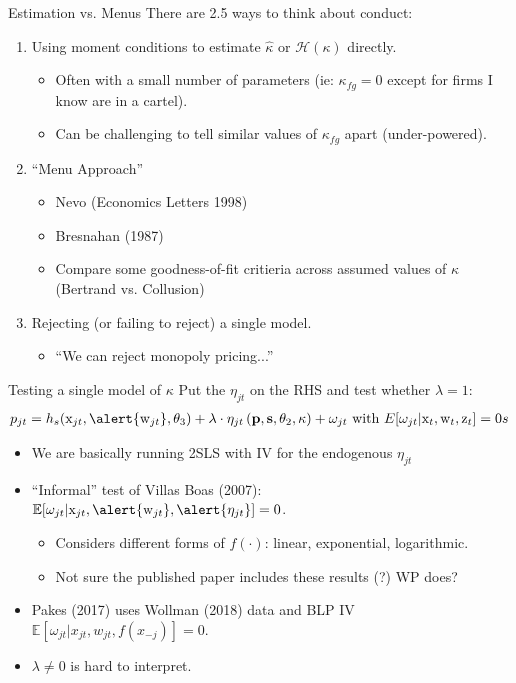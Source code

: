\begin{frame}{Estimation vs. Menus}
There are 2.5 ways to think about conduct:
\begin{enumerate}
\item Using moment conditions to estimate $\widehat{\kappa}$ or $\mathcal{H}(\kappa)$ directly.
\begin{itemize}
\item Often with a small number of parameters (ie: $\kappa_{fg}=0$ except for firms I know are in a cartel).
\item Can be challenging to tell similar values of $\kappa_{fg}$ apart (under-powered).
\end{itemize}
\item ``Menu Approach''
\begin{itemize}
\item  Nevo (Economics Letters 1998)
\item Bresnahan (1987)
\item Compare some goodness-of-fit critieria across assumed values of $\kappa$ (Bertrand vs. Collusion)
  \end{itemize}
\item Rejecting (or failing to reject) a single model.
\begin{itemize}
  \item ``We can reject monopoly pricing...''
\end{itemize}
  \end{enumerate}
\end{frame}


\begin{frame}{Testing a single model of $\kappa$}
Put the $\eta_{jt}$ on the RHS and test whether $\lambda=1$:
\begin{align*}
 p_{jt} = h_s(\textrm{x}_{jt}, \alert{\textrm{w}_{jt}},\theta_3) + \lambda \cdot \eta_{jt}\left(\mathbf{p},\mathbf{s},\theta_2,\kappa \right)+  \omega_{jt} \text{ with }
 E[\omega_{jt} | \textrm{x}_{t},\textrm{w}_{t},\textrm{z}_{t}]=0s
\end{align*}
\vspace{-0.25cm}
\begin{itemize}
\item We are basically running 2SLS with IV for the endogenous $\eta_{jt}$
\item ``Informal'' test of Villas Boas (2007): $\mathbb{E}[\omega_{jt} | \textrm{x}_{jt},\alert{\textrm{w}_{jt}},\alert{\eta_{jt}}]=0$.
\begin{itemize}
\item Considers different forms of $f(\cdot)$: linear, exponential, logarithmic.
\item Not sure the published paper includes these results (?) WP does?
  \end{itemize}
\item Pakes (2017) uses Wollman (2018) data and BLP IV $\mathbb{E}[\omega_{jt} | x_{jt},w_{jt},f(x_{-j})]=0$.
\item $\lambda \neq 0$ is hard to interpret.
\end{itemize}
\end{frame}


